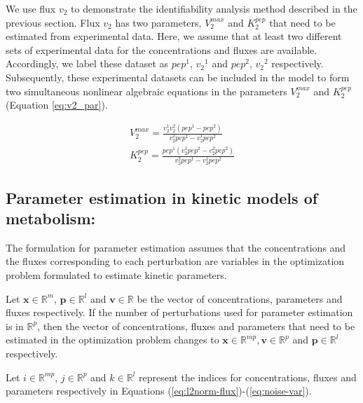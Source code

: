 \documentclass[10pt]{article}
\begin{document}
	We use flux $v_2$ to demonstrate the identifiability analysis method described in the previous section. Flux $v_2$ has two parameters, $V_2^{max}$ and $K_2^{pep}$ that need to be estimated from experimental data. Here, we assume that at least two different sets of experimental data for the concentrations and fluxes are available. Accordingly, we label these dataset as ${pep}^1$, ${v_2}^1$ and ${pep}^2$, ${v_2}^2$ respectively. Subsequently, these experimental datasets can be included in the model to form two simultaneous nonlinear algebraic equations in the parameters $V_2^{max}$ and $K_2^{pep}$ (Equation \ref{eq:v2_par}).
	
	\begin{subequations}\label{eq:v2_par}
		\begin{align}		
		V_2^{max} = \frac{v_2^1v_2^2(pep^1-pep^2)}{v_2^2pep^1-v_2^1pep^2}\\
		K_2^{pep} = \frac{pep^1(v_2^1pep^2-v_2^2pep^2)}{v_2^2pep^1-v_2^1pep^2}
		\end{align}
	\end{subequations}
	
	
	
	\subsection{Parameter estimation in kinetic models of metabolism:}
	The formulation for parameter estimation assumes that the concentrations and the fluxes corresponding to each perturbation are variables in the optimization problem formulated to estimate kinetic parameters.
	
	Let $\mathbf{x}\in\mathbb{R}^m$, $\mathbf{p}\in\mathbb{R}^l$ and $\mathbf{v}\in\mathbb{R}$ be the vector of concentrations, parameters and fluxes respectively. If the number of perturbations used for parameter estimation is in $\mathbb{R}^p$, then the vector of concentrations, fluxes and parameters that need to be estimated in the optimization problem changes to $\mathbf{x}\in\mathbb{R}^{mp}, \mathbf{v}\in\mathbb{R}^{p}$ and $\mathbf{p}\in\mathbb{R}^{l}$ respectively. 
	
	Let $i\in\mathbb{R}^{mp}$, $j\in\mathbb{R}^{p}$ and $k\in\mathbb{R}^{l}$ represent the indices for concentrations, fluxes and parameters respectively in Equations (\ref{eq:l2norm-flux})-(\ref{eq:noise-var}).
	
\end{document}
